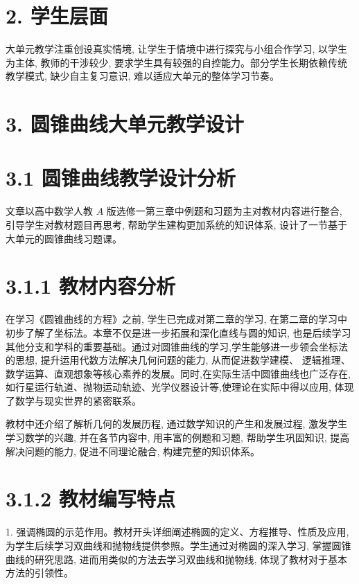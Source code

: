 \documentclass[10pt]{article}
\begin{document}
\section*{2. 学生层面}

大单元教学注重创设真实情境, 让学生于情境中进行探究与小组合作学习, 以学生为主体, 教师的干涉较少, 要求学生具有较强的自控能力。部分学生长期依赖传统教学模式, 缺少自主复习意识, 难以适应大单元的整体学习节奏。

\section*{3. 圆锥曲线大单元教学设计}

\section*{3.1 圆锥曲线教学设计分析}

文章以高中数学人教 \(A\) 版选修一第三章中例题和习题为主对教材内容进行整合, 引导学生对教材题目再思考, 帮助学生建构更加系统的知识体系, 设计了一节基于大单元的圆锥曲线习题课。

\section*{3.1.1 教材内容分析}

在学习《圆锥曲线的方程》之前, 学生已完成对第二章的学习, 在第二章的学习中初步了解了坐标法。本章不仅是进一步拓展和深化直线与圆的知识, 也是后续学习其他分支和学科的重要基础。通过对圆锥曲线的学习,学生能够进一步领会坐标法的思想, 提升运用代数方法解决几何问题的能力, 从而促进数学建模、 逻辑推理、数学运算、直观想象等核心素养的发展。同时,在实际生活中圆锥曲线也广泛存在,如行星运行轨道、抛物运动轨迹、光学仪器设计等,使理论在实际中得以应用, 体现了数学与现实世界的紧密联系。

教材中还介绍了解析几何的发展历程, 通过数学知识的产生和发展过程, 激发学生学习数学的兴趣, 并在各节内容中, 用丰富的例题和习题, 帮助学生巩固知识, 提高解决问题的能力, 促进不同理论融合, 构建完整的知识体系。

\section*{3.1.2 教材编写特点}

1. 强调椭圆的示范作用。教材开头详细阐述椭圆的定义、方程推导、性质及应用, 为学生后续学习双曲线和抛物线提供参照。学生通过对椭圆的深入学习, 掌握圆锥曲线的研究思路, 进而用类似的方法去学习双曲线和抛物线, 体现了教材对于基本方法的引领性。
\end{document}
